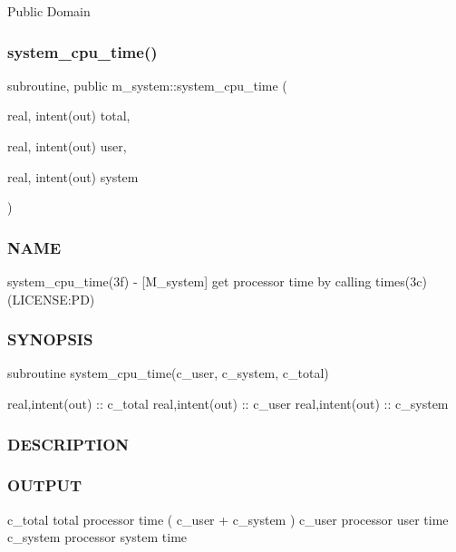 Public Domain \mbox{\label{namespacem__system_a257d2b8987db850bc686507f19ccbe4a}} 
\subsubsection{\texorpdfstring{system\+\_\+cpu\+\_\+time()}{system\_cpu\_time()}}
{\footnotesize\ttfamily subroutine, public m\+\_\+system\+::system\+\_\+cpu\+\_\+time (\begin{DoxyParamCaption}\item[{real, intent(out)}]{total,  }\item[{real, intent(out)}]{user,  }\item[{real, intent(out)}]{system }\end{DoxyParamCaption})}



\subsubsection*{N\+A\+ME}

system\+\_\+cpu\+\_\+time(3f) -\/ \mbox{[}M\+\_\+system\mbox{]} get processor time by calling times(3c) (L\+I\+C\+E\+N\+SE\+:PD) 

\subsubsection*{S\+Y\+N\+O\+P\+S\+IS}

\begin{DoxyVerb}    subroutine system_cpu_time(c_user, c_system, c_total)

     real,intent(out) :: c_total
     real,intent(out) :: c_user
     real,intent(out) :: c_system
\end{DoxyVerb}


\subsubsection*{D\+E\+S\+C\+R\+I\+P\+T\+I\+ON}

\subsubsection*{O\+U\+T\+P\+UT}

c\+\_\+total total processor time ( c\+\_\+user + c\+\_\+system ) c\+\_\+user processor user time c\+\_\+system processor system time

